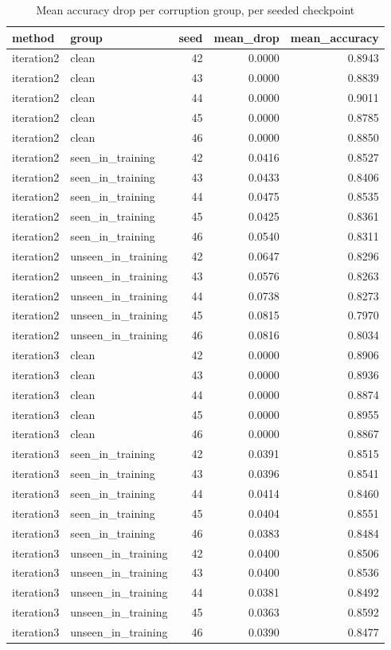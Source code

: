 \begin{table}
\caption{Mean accuracy drop per corruption group, per seeded checkpoint}
\begin{tabular}{llrrr}
\toprule
method & group & seed & mean\_drop & mean\_accuracy \\
\midrule
iteration2 & clean & 42 & 0.0000 & 0.8943 \\
iteration2 & clean & 43 & 0.0000 & 0.8839 \\
iteration2 & clean & 44 & 0.0000 & 0.9011 \\
iteration2 & clean & 45 & 0.0000 & 0.8785 \\
iteration2 & clean & 46 & 0.0000 & 0.8850 \\
iteration2 & seen\_in\_training & 42 & 0.0416 & 0.8527 \\
iteration2 & seen\_in\_training & 43 & 0.0433 & 0.8406 \\
iteration2 & seen\_in\_training & 44 & 0.0475 & 0.8535 \\
iteration2 & seen\_in\_training & 45 & 0.0425 & 0.8361 \\
iteration2 & seen\_in\_training & 46 & 0.0540 & 0.8311 \\
iteration2 & unseen\_in\_training & 42 & 0.0647 & 0.8296 \\
iteration2 & unseen\_in\_training & 43 & 0.0576 & 0.8263 \\
iteration2 & unseen\_in\_training & 44 & 0.0738 & 0.8273 \\
iteration2 & unseen\_in\_training & 45 & 0.0815 & 0.7970 \\
iteration2 & unseen\_in\_training & 46 & 0.0816 & 0.8034 \\
iteration3 & clean & 42 & 0.0000 & 0.8906 \\
iteration3 & clean & 43 & 0.0000 & 0.8936 \\
iteration3 & clean & 44 & 0.0000 & 0.8874 \\
iteration3 & clean & 45 & 0.0000 & 0.8955 \\
iteration3 & clean & 46 & 0.0000 & 0.8867 \\
iteration3 & seen\_in\_training & 42 & 0.0391 & 0.8515 \\
iteration3 & seen\_in\_training & 43 & 0.0396 & 0.8541 \\
iteration3 & seen\_in\_training & 44 & 0.0414 & 0.8460 \\
iteration3 & seen\_in\_training & 45 & 0.0404 & 0.8551 \\
iteration3 & seen\_in\_training & 46 & 0.0383 & 0.8484 \\
iteration3 & unseen\_in\_training & 42 & 0.0400 & 0.8506 \\
iteration3 & unseen\_in\_training & 43 & 0.0400 & 0.8536 \\
iteration3 & unseen\_in\_training & 44 & 0.0381 & 0.8492 \\
iteration3 & unseen\_in\_training & 45 & 0.0363 & 0.8592 \\
iteration3 & unseen\_in\_training & 46 & 0.0390 & 0.8477 \\
\bottomrule
\end{tabular}
\end{table}
